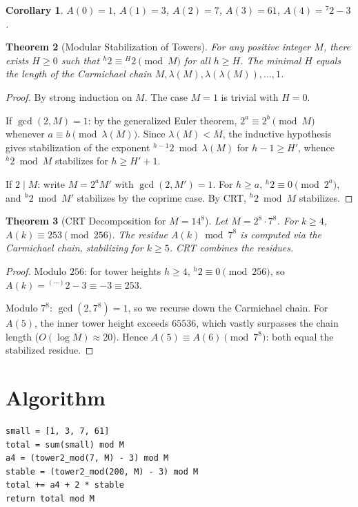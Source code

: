\documentclass[12pt]{article}
\newtheorem{theorem}{Theorem}
\newtheorem{corollary}[theorem]{Corollary}
\begin{document}
\begin{corollary}
$A(0)=1$, $A(1)=3$, $A(2)=7$, $A(3)=61$, $A(4) = {}^{7}2 - 3$.
\end{corollary}

\begin{theorem}[Modular Stabilization of Towers]
For any positive integer $M$, there exists $H \ge 0$ such that ${}^{h}2 \equiv {}^{H}2 \pmod{M}$ for all $h \ge H$. The minimal $H$ equals the length of the Carmichael chain $M, \lambda(M), \lambda(\lambda(M)), \ldots, 1$.
\end{theorem}

\begin{proof}
By strong induction on $M$. The case $M=1$ is trivial with $H=0$.

If $\gcd(2,M)=1$: by the generalized Euler theorem, $2^a \equiv 2^b \pmod{M}$ whenever $a \equiv b \pmod{\lambda(M)}$. Since $\lambda(M) < M$, the inductive hypothesis gives stabilization of the exponent ${}^{h-1}2 \bmod \lambda(M)$ for $h-1 \ge H'$, whence ${}^{h}2 \bmod M$ stabilizes for $h \ge H'+1$.

If $2 \mid M$: write $M = 2^a M'$ with $\gcd(2,M')=1$. For $h \ge a$, ${}^{h}2 \equiv 0 \pmod{2^a}$, and ${}^{h}2 \bmod M'$ stabilizes by the coprime case. By CRT, ${}^{h}2 \bmod M$ stabilizes.
\end{proof}

\begin{theorem}[CRT Decomposition for $M = 14^8$]
Let $M = 2^8 \cdot 7^8$. For $k \ge 4$, $A(k) \equiv 253 \pmod{256}$. The residue $A(k) \bmod 7^8$ is computed via the Carmichael chain, stabilizing for $k \ge 5$. CRT combines the residues.
\end{theorem}

\begin{proof}
Modulo $256$: for tower heights $h \ge 4$, ${}^{h}2 \equiv 0 \pmod{256}$, so $A(k) = {}^{(\cdots)}2 - 3 \equiv -3 \equiv 253$.

Modulo $7^8$: $\gcd(2,7^8)=1$, so we recurse down the Carmichael chain. For $A(5)$, the inner tower height exceeds $65536$, which vastly surpasses the chain length ($O(\log M) \approx 20$). Hence $A(5) \equiv A(6) \pmod{7^8}$: both equal the stabilized residue.
\end{proof}

\section{Algorithm}

\begin{verbatim}
small = [1, 3, 7, 61]
total = sum(small) mod M
a4 = (tower2_mod(7, M) - 3) mod M
stable = (tower2_mod(200, M) - 3) mod M
total += a4 + 2 * stable
return total mod M
\end{verbatim}
\end{document}
